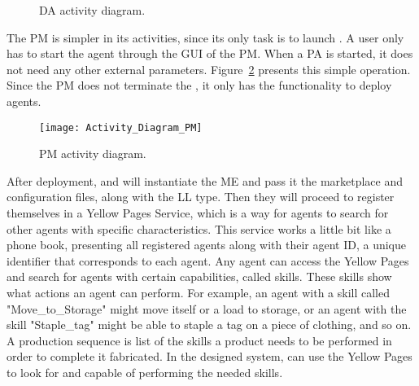 \begin{figure}[H]
	\centering
	\hspace{0.40cm}
	\caption{\acrlong{DA} activity diagram.}
	\label{fig:da_activity_diagrams}
\end{figure}

The \acrlong{PM} is simpler in its activities, since its only task is to launch . A user only has to start the agent through the \acrshort{GUI} of the \acrshort{PM}. When a \acrshort{PA} is started, it does not need any other external parameters. Figure~\ref{fig:pm_activity_diagram} presents this simple operation. Since the \acrshort{PM} does not terminate the , it only has the functionality to deploy agents.\\

\begin{figure}[h!]
	\centering
	\texttt{[image: Activity\_Diagram\_PM]}
	\caption{\acrlong{PM} activity diagram.}
	\label{fig:pm_activity_diagram}
\end{figure}

After deployment,  and  will instantiate the \acrlong{ME} and pass it the marketplace and configuration files, along with the \acrshort{LL} type. Then they will proceed to register themselves in a Yellow Pages Service, which is a way for agents to search for other agents with specific characteristics. This service works a little bit like a phone book, presenting all registered agents along with their agent ID, a unique identifier that corresponds to each agent. Any agent can access the Yellow Pages and search for agents with certain capabilities, called skills. These skills show what actions an agent can perform. For example, an agent with a skill called "Move\_to\_Storage" might move itself or a load to storage, or an agent with the skill "Staple\_tag" might be able to staple a tag on a piece of clothing, and so on. A production sequence is list of the skills a product needs to be performed in order to complete it fabricated. In the designed system,  can use the Yellow Pages to look for  and  capable of performing the needed skills.\\

